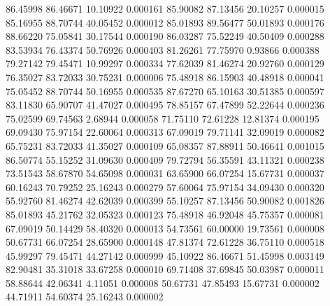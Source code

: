        86.45998       86.46671       10.10922       0.000161
       85.90082       87.13456       20.10257       0.000015
       85.16955       88.70744       40.05452       0.000012
       85.01893       89.56477       50.01893       0.000176
       88.66220       75.05841       30.17544       0.000190
       86.03287       75.52249       40.50409       0.000288
       83.53934       76.43374       50.76926       0.000403
       81.26261       77.75970        0.93866       0.000388
       79.27142       79.45471       10.99297       0.000334
       77.62039       81.46274       20.92760       0.000129
       76.35027       83.72033       30.75231       0.000006
       75.48918       86.15903       40.48918       0.000041
       75.05452       88.70744       50.16955       0.000535
       87.67270       65.10163       30.51385       0.000597
       83.11830       65.90707       41.47027       0.000495
       78.85157       67.47899       52.22644       0.000236
       75.02599       69.74563        2.68944       0.000058
       71.75110       72.61228       12.81374       0.000195
       69.09430       75.97154       22.60064       0.000313
       67.09019       79.71141       32.09019       0.000082
       65.75231       83.72033       41.35027       0.000109
       65.08357       87.88911       50.46641       0.001015
       86.50774       55.15252       31.09630       0.000409
       79.72794       56.35591       43.11321       0.000238
       73.51543       58.67870       54.65098       0.000031
       63.65900       66.07254       15.67731       0.000037
       60.16243       70.79252       25.16243       0.000279
       57.60064       75.97154       34.09430       0.000320
       55.92760       81.46274       42.62039       0.000399
       55.10257       87.13456       50.90082       0.001826
       85.01893       45.21762       32.05323       0.000123
       75.48918       46.92048       45.75357       0.000081
       67.09019       50.14429       58.40320       0.000013
       54.73561       60.00000       19.73561       0.000008
       50.67731       66.07254       28.65900       0.000148
       47.81374       72.61228       36.75110       0.000518
       45.99297       79.45471       44.27142       0.000999
       45.10922       86.46671       51.45998       0.003149
       82.90481       35.31018       33.67258       0.000010
       69.71408       37.69845       50.03987       0.000011
       58.88644       42.06341        4.11051       0.000008
       50.67731       47.85493       15.67731       0.000002
       44.71911       54.60374       25.16243       0.000002
